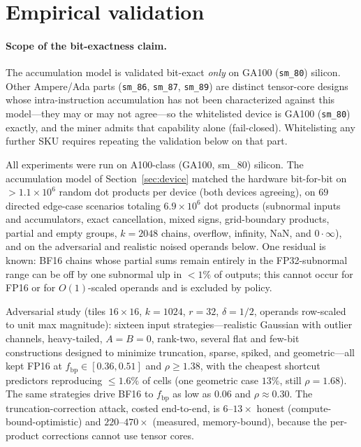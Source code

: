 \documentclass[11pt]{article}
\newcommand{\FP}[1]{\textsf{FP#1}}
\begin{document}
\section{Empirical validation}\label{app:validation}
\paragraph{Scope of the bit-exactness claim.} The accumulation model is validated bit-exact
\emph{only} on GA100 (\texttt{sm\_80}) silicon. Other Ampere/Ada parts (\texttt{sm\_86},
\texttt{sm\_87}, \texttt{sm\_89}) are distinct tensor-core designs whose intra-instruction
accumulation has not been characterized against this model---they may or may not agree---so the
whitelisted device is GA100 (\texttt{sm\_80}) exactly, and the miner admits that capability alone
(fail-closed). Whitelisting any further SKU requires repeating the validation below on that part.

All experiments were run on A100-class (GA100, sm\_80) silicon. The accumulation model of
Section~\ref{sec:device} matched the hardware bit-for-bit on $>1.1\times10^6$ random dot products
per device (both devices agreeing), on $69$ directed edge-case scenarios totaling $6.9\times10^6$
dot products (subnormal inputs and accumulators, exact cancellation, mixed signs, grid-boundary
products, partial and empty groups, $k=2048$ chains, overflow, infinity, NaN, and $0\cdot\infty$),
and on the adversarial and realistic noised operands below. One residual is known: \textsf{BF16}
chains whose partial sums remain entirely in the \FP{32}-subnormal range can be off by one
subnormal ulp in $<\!1\%$ of outputs; this cannot occur for \FP{16} or for $O(1)$-scaled operands
and is excluded by policy.

Adversarial study (tiles $16\times16$, $k=1024$, $r=32$, $\delta=1/2$, operands row-scaled to unit
max magnitude): sixteen input strategies---realistic Gaussian with outlier channels, heavy-tailed,
$A=B=0$, rank-two, several flat and few-bit constructions designed to minimize truncation, sparse,
spiked, and geometric---all kept \FP{16} at $f_{\text{bp}}\in[0.36,0.51]$ and $\rho\ge 1.38$, with
the cheapest shortcut predictors reproducing $\le 1.6\%$ of cells (one geometric case $13\%$, still
$\rho=1.68$). The same strategies drive \textsf{BF16} to $f_{\text{bp}}$ as low as $0.06$ and
$\rho\approx 0.30$. The truncation-correction attack, costed end-to-end, is $6\text{--}13\times$
honest (compute-bound-optimistic) and $220\text{--}470\times$ (measured, memory-bound), because the
per-product corrections cannot use tensor cores.
\end{document}
